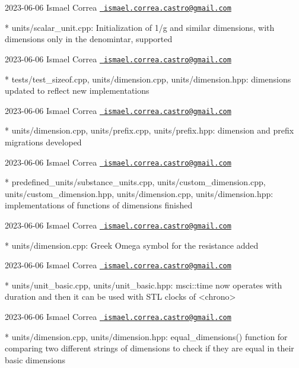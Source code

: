  2023-\/06-\/06 Ismael Correa \href{mailto:ismael.correa.castro@gmail.com}{\texttt{ ismael.\+correa.\+castro@gmail.\+com}} \begin{DoxyVerb}* units/scalar_unit.cpp: Initialization of 1/g and similar
dimensions, with dimensions only in the denomintar, supported
\end{DoxyVerb}
 2023-\/06-\/06 Ismael Correa \href{mailto:ismael.correa.castro@gmail.com}{\texttt{ ismael.\+correa.\+castro@gmail.\+com}} \begin{DoxyVerb}* tests/test_sizeof.cpp, units/dimension.cpp, units/dimension.hpp: 
dimensions updated to reflect new implementations
\end{DoxyVerb}
 2023-\/06-\/06 Ismael Correa \href{mailto:ismael.correa.castro@gmail.com}{\texttt{ ismael.\+correa.\+castro@gmail.\+com}} \begin{DoxyVerb}* units/dimension.cpp, units/prefix.cpp, units/prefix.hpp: dimension
and prefix migrations developed
\end{DoxyVerb}
 2023-\/06-\/06 Ismael Correa \href{mailto:ismael.correa.castro@gmail.com}{\texttt{ ismael.\+correa.\+castro@gmail.\+com}} \begin{DoxyVerb}* predefined_units/substance_units.cpp, units/custom_dimension.cpp,
units/custom_dimension.hpp, units/dimension.cpp,
units/dimension.hpp: implementations of functions of dimensions
finished
\end{DoxyVerb}
 2023-\/06-\/06 Ismael Correa \href{mailto:ismael.correa.castro@gmail.com}{\texttt{ ismael.\+correa.\+castro@gmail.\+com}} \begin{DoxyVerb}* units/dimension.cpp: Greek Omega symbol for the resistance added
\end{DoxyVerb}
 2023-\/06-\/06 Ismael Correa \href{mailto:ismael.correa.castro@gmail.com}{\texttt{ ismael.\+correa.\+castro@gmail.\+com}} \begin{DoxyVerb}* units/unit_basic.cpp, units/unit_basic.hpp: msci::time now
operates with duration and then it can be used with STL clocks of
<chrono>
\end{DoxyVerb}
 2023-\/06-\/06 Ismael Correa \href{mailto:ismael.correa.castro@gmail.com}{\texttt{ ismael.\+correa.\+castro@gmail.\+com}} \begin{DoxyVerb}* units/dimension.cpp, units/dimension.hpp: equal_dimensions()
function for comparing two different strings of dimensions to check
if they are equal in their basic dimensions
\end{DoxyVerb}
